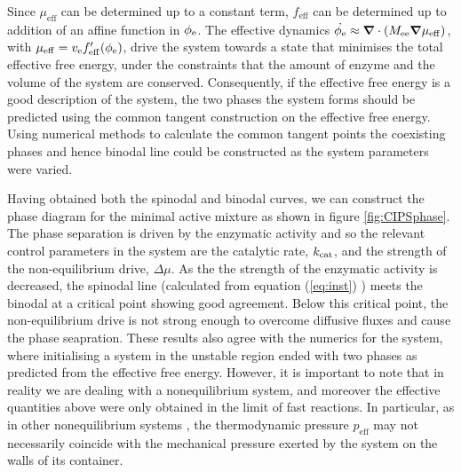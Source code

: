 Since $\mu_\mathrm{eff}$ can be determined up to a constant term, $f_\mathrm{eff}$ can be determined up to addition of an affine function in $\phi_{\mathrm{e}}$. The effective dynamics $\dot{\phi_{\mathrm{e}}}\approx \bm{\nabla} \cdot (M_{\mathrm{ee}}\bm{\nabla}\mu_\mathrm{eff})$, with $\mu_\mathrm{eff}=v_{\mathrm{e}} f'_\mathrm{eff}(\phi_{\mathrm{e}})$, drive the system towards a state that minimises the total effective free energy, under the constraints that the amount of enzyme and the volume of the system are conserved. Consequently, if the effective free energy is a good description of the system, the two phases the system forms should be predicted using the common tangent construction on the effective free energy. Using numerical methods to calculate the common tangent points \cite{wolff_thermodynamic_2011, doi_soft_2013} the coexisting phases and hence binodal line could be constructed as the system parameters were varied.

Having obtained both the spinodal and binodal curves, we can construct the phase diagram for the minimal active mixture as shown in figure \ref{fig:CIPSphase}. The phase separation is driven by the enzymatic activity and so the relevant control parameters in the system are the catalytic rate, $k_{\mathrm{cat}}$, and the strength of the non-equilibrium drive, $\Delta\mu$. As the the strength of the enzymatic activity is decreased, the spinodal line (calculated from equation (\ref{eq:inst}) ) meets the binodal at a critical point showing good agreement. Below this critical point, the non-equilibrium drive is not strong enough to overcome diffusive fluxes and cause the phase seapration. These results also agree with the numerics for the system, where initialising a system in the unstable region ended with two phases as predicted from the effective free energy. However, it is important to note that in reality we are dealing with a nonequilibrium system, and moreover the effective quantities above were only obtained in the limit of fast reactions. In particular, as in other nonequilibrium systems \cite{wittkowski_scalar_2014}, the thermodynamic pressure $p_\mathrm{eff}$ may not necessarily coincide with the mechanical pressure exerted by the system on the walls of its container.

